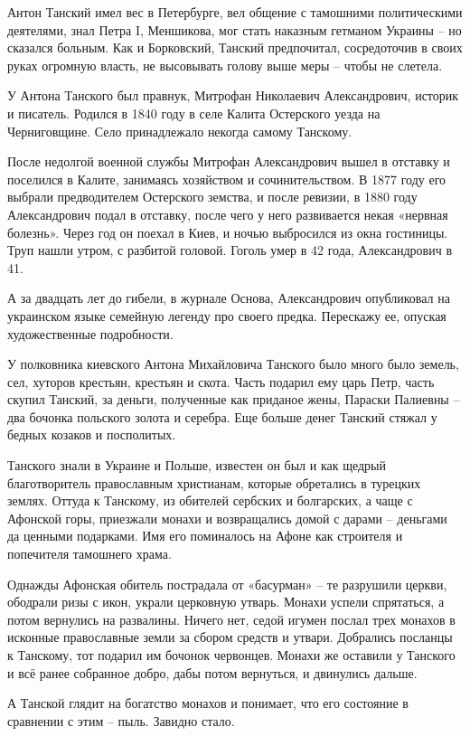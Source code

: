 \documentclass[a5paper,11pt,openany]{article}
\begin{document}
   Антон Танский имел вес в Петербурге, вел общение с тамошними политическими деятелями, знал Петра I, Меншикова, мог стать наказным гетманом Украины – но сказался больным. Как и Борковский, Танский предпочитал, сосредоточив в своих руках огромную власть, не высовывать голову выше меры – чтобы не слетела.

   У Антона Танского был правнук, Митрофан Николаевич Александрович, историк и писатель. Родился в 1840 году в селе Калита Остерского уезда на Черниговщине. Село принадлежало некогда самому Танскому.

   После недолгой военной службы Митрофан Александрович вышел в отставку и поселился в Калите, занимаясь хозяйством и сочинительством. В 1877 году его выбрали предводителем Остерского земства, и после ревизии, в 1880 году Александрович подал в отставку, после чего у него развивается некая «нервная болезнь». Через год он поехал в Киев, и ночью выбросился из окна гостиницы. Труп нашли утром, с разбитой головой. Гоголь умер в 42 года, Александрович в 41.

   А за двадцать лет до гибели, в журнале Основа, Александрович опубликовал\cite{zmiy} на украинском языке семейную легенду про своего предка. Перескажу ее, опуская художественные подробности.

У полковника киевского Антона Михайловича Танского было много было земель, сел, хуторов крестьян, крестьян и скота. Часть подарил ему царь Петр, часть скупил Танский, за деньги, полученные как приданое жены, Параски Палиевны – два бочонка польского золота и серебра. Еще больше денег Танский стяжал у бедных козаков и посполитых.

   Танского знали в Украине и Польше, известен он был и как щедрый благотворитель православным христианам, которые обретались в турецких землях. Оттуда к Танскому, из обителей сербских и болгарских, а чаще с Афонской горы, приезжали монахи и возвращались домой с дарами – деньгами да ценными подарками. Имя его поминалось на Афоне как строителя и попечителя тамошнего храма.

   Однажды Афонская обитель пострадала от «басурман» – те разрушили церкви, ободрали ризы с икон, украли церковную утварь. Монахи успели спрятаться, а потом вернулись на развалины. Ничего нет, седой игумен послал трех монахов в исконные православные земли за сбором средств и утвари. Добрались посланцы к Танскому, тот подарил им бочонок червонцев. Монахи же оставили у Танского и всё ранее собранное добро, дабы потом вернуться, и двинулись дальше.

   А Танской глядит на богатство монахов и понимает, что его состояние в сравнении с этим – пыль. Завидно стало. 
\end{document}
